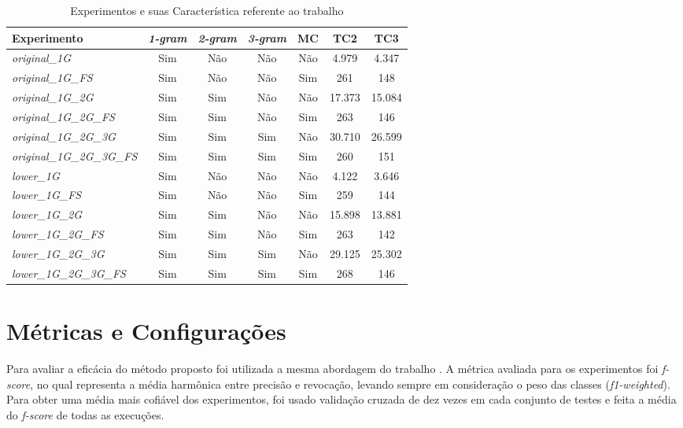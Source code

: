 \begin{table}[h]
    \centering
    {\renewcommand \arraystretch{1.25}
        \begin{tabular}{ l c c c c c c }
            \hline
            {\bf Experimento} & {\it \bf 1-gram } & {\it \bf 2-gram } & {\it \bf 3-gram } &
            {\bf MC } & {\bf TC2 } & {\bf TC3 } \\  
            \hline
            
            {\it original\_1G} & Sim & Não & Não & Não & 4.979 & 4.347 \\
            {\it original\_1G\_FS} & Sim & Não & Não & Sim & 261 & 148 \\
            {\it original\_1G\_2G} & Sim & Sim & Não & Não & 17.373 & 15.084 \\
            {\it original\_1G\_2G\_FS} & Sim & Sim & Não & Sim & 263 & 146 \\
            {\it original\_1G\_2G\_3G} & Sim & Sim & Sim & Não & 30.710 & 26.599 \\
            {\it original\_1G\_2G\_3G\_FS} & Sim &  Sim & Sim & Sim & 260 & 151 \\
            {\it lower\_1G} & Sim &  Não & Não & Não & 4.122 & 3.646 \\
            {\it lower\_1G\_FS} & Sim &  Não & Não & Sim & 259 & 144 \\
            {\it lower\_1G\_2G} & Sim &  Sim & Não & Não & 15.898 & 13.881 \\
            {\it lower\_1G\_2G\_FS} & Sim &  Sim & Não & Sim & 263 & 142 \\
            {\it lower\_1G\_2G\_3G} & Sim &  Sim & Sim & Não & 29.125 & 25.302 \\
            {\it lower\_1G\_2G\_3G\_FS} & Sim &  Sim & Sim & Sim & 268 & 146 \\
            \hline
        \end{tabular} 
    }
    \caption{Experimentos e suas Característica referente ao trabalho \cite{Pelle2017}}\label{tab:proposta-base-dados-experimentos}
\end{table}

\section{Métricas e Configurações}\label{sec:proposta-metricas}
Para avaliar a eficácia do método proposto foi utilizada a mesma abordagem do trabalho \cite{Pelle2017}. A métrica avaliada para os experimentos foi {\it f-score}, no qual representa a média harmônica entre precisão e revocação, levando sempre em consideração o peso das classes ({\it f1-weighted}). Para obter uma média mais cofiável dos experimentos, foi usado validação cruzada de dez vezes em cada conjunto de testes e feita a média do {\it f-score} de todas as execuções. 

